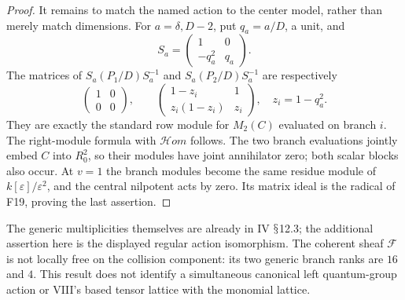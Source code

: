 \documentclass[11pt,a4paper]{article}
\renewcommand{\S}{\ensuremath{\mathsection}}
\newcommand{\fid}[1]{\textsf{#1}}\newcommand{\gate}[1]{\textsf{#1}}
\theoremstyle{named}\newtheorem{finding}{Finding}[section]
\theoremstyle{definition}\newtheorem{definition}[finding]{Definition}
\theoremstyle{remark}\newtheorem{remark}[finding]{Remark}
\begin{document}
\begin{proof}
It remains to match the named action to the center model, rather than
merely match dimensions. For $a=\delta,D-2$, put $q_a=a/D$, a unit, and
\[
 S_a=\begin{pmatrix}1&0\\-q_a^2&q_a\end{pmatrix}.
\]
The matrices of $S_a(P_1/D)S_a^{-1}$ and $S_a(P_2/D)S_a^{-1}$ are
respectively
\[
 \begin{pmatrix}1&0\\0&0\end{pmatrix},\qquad
 \begin{pmatrix}1-z_i&1\\z_i(1-z_i)&z_i\end{pmatrix},
 \quad z_i=1-q_a^2.
\]
They are exactly the standard row module for $M_2(C)$ evaluated on branch
$i$. The right-module formula with $\mathcal Hom$ follows. The two branch
evaluations jointly embed $C$ into $R_0^2$, so their modules have joint
annihilator zero; both scalar blocks also occur. At $v=1$ the branch
modules become the same residue module of $k[\varepsilon]/\varepsilon^2$,
and the central nilpotent acts by zero. Its matrix ideal is the radical
of \fid{F19}, proving the last assertion.
\end{proof}
The generic multiplicities themselves are already in IV \S12.3; the
additional assertion here is the displayed regular action isomorphism.
The coherent sheaf $\mathcal F$ is not locally free on the collision
component: its two generic branch ranks are $16$ and $4$. This result
does not identify a simultaneous canonical left quantum-group action
or VIII's based tensor lattice with the monomial lattice.
\end{document}
